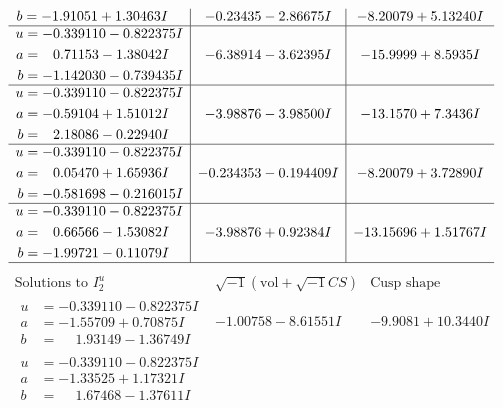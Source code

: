 \documentclass[1p]{elsarticle_modified}
\theoremstyle{definition}
\newcommand{\I}{\sqrt{-1}}
\begin{document}
$$\begin{array}{c|c|c}
\begin{aligned}
b &= -1.91051 + 1.30463 I\end{aligned}
 & -0.23435 - 2.86675 I & -8.20079 + 5.13240 I \\ \hline\begin{aligned}
u &= -0.339110 - 0.822375 I \\
a &= \phantom{-}0.71153 - 1.38042 I \\
b &= -1.142030 - 0.739435 I\end{aligned}
 & -6.38914 - 3.62395 I & -15.9999 + 8.5935 I \\ \hline\begin{aligned}
u &= -0.339110 - 0.822375 I \\
a &= -0.59104 + 1.51012 I \\
b &= \phantom{-}2.18086 - 0.22940 I\end{aligned}
 & -3.98876 - 3.98500 I & -13.1570 + 7.3436 I \\ \hline\begin{aligned}
u &= -0.339110 - 0.822375 I \\
a &= \phantom{-}0.05470 + 1.65936 I \\
b &= -0.581698 - 0.216015 I\end{aligned}
 & -0.234353 - 0.194409 I & -8.20079 + 3.72890 I \\ \hline\begin{aligned}
u &= -0.339110 - 0.822375 I \\
a &= \phantom{-}0.66566 - 1.53082 I \\
b &= -1.99721 - 0.11079 I\end{aligned}
 & -3.98876 + 0.92384 I & -13.15696 + 1.51767 I\\
 \hline 
 \end{array}$$\newpage$$\begin{array}{c|c|c}  
\text{Solutions to }I^u_{2}& \I (\text{vol} + \sqrt{-1}CS) & \text{Cusp shape}\\
 \hline 
\begin{aligned}
u &= -0.339110 - 0.822375 I \\
a &= -1.55709 + 0.70875 I \\
b &= \phantom{-}1.93149 - 1.36749 I\end{aligned}
 & -1.00758 - 8.61551 I & -9.9081 + 10.3440 I \\ \hline\begin{aligned}
u &= -0.339110 - 0.822375 I \\
a &= -1.33525 + 1.17321 I \\
b &= \phantom{-}1.67468 - 1.37611 I\end{aligned}

\end{array}$$
\end{document}
